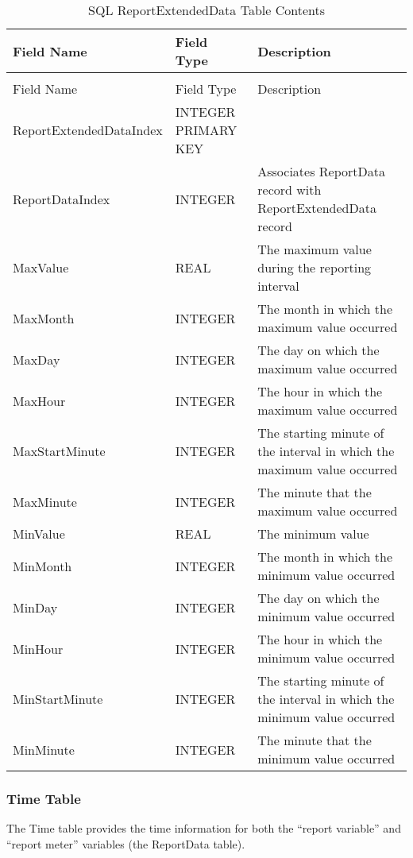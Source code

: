 {\scriptsize
\begin{longtable}[c]{>{\raggedright}p{1.5in}>{\raggedright}p{1.5in}>{\raggedright}p{3.0in}}
\caption{SQL ReportExtendedData Table Contents \label{table:table-9.-sql-reportextendeddata-table}} \tabularnewline
\toprule 
Field Name & Field Type & Description \tabularnewline
\midrule
\endfirsthead

\caption[]{SQL ReportExtendedData Table Contents} \tabularnewline
\toprule 
Field Name & Field Type & Description \tabularnewline
\midrule
\endhead

ReportExtended\-Data\-Index & INTEGER PRIMARY KEY &  \tabularnewline
ReportDataIndex & INTEGER & Associates ReportData record with ReportExtendedData record \tabularnewline
MaxValue & REAL & The maximum value during the reporting interval \tabularnewline
MaxMonth & INTEGER & The month in which the maximum value occurred \tabularnewline
MaxDay & INTEGER & The day on which the maximum value occurred \tabularnewline
MaxHour & INTEGER & The hour in which the maximum value occurred \tabularnewline
MaxStartMinute & INTEGER & The starting minute of the interval in which the maximum value occurred \tabularnewline
MaxMinute & INTEGER & The minute that the maximum value occurred \tabularnewline
MinValue & REAL & The minimum value \tabularnewline
MinMonth & INTEGER & The month in which the minimum value occurred \tabularnewline
MinDay & INTEGER & The day on which the minimum value occurred \tabularnewline
MinHour & INTEGER & The hour in which the minimum value occurred \tabularnewline
MinStartMinute & INTEGER & The starting minute of the interval in which the minimum value occurred \tabularnewline
MinMinute & INTEGER & The minute that the minimum value occurred \tabularnewline
\bottomrule
\end{longtable}}

\subsubsection{Time Table}

The Time table provides the time information for both the “report variable” and “report meter” variables (the ReportData table).

